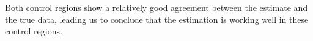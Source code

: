 Both control regions show a relatively good agreement between the estimate and the true data, leading us to conclude that the estimation is working well in these control regions. 





